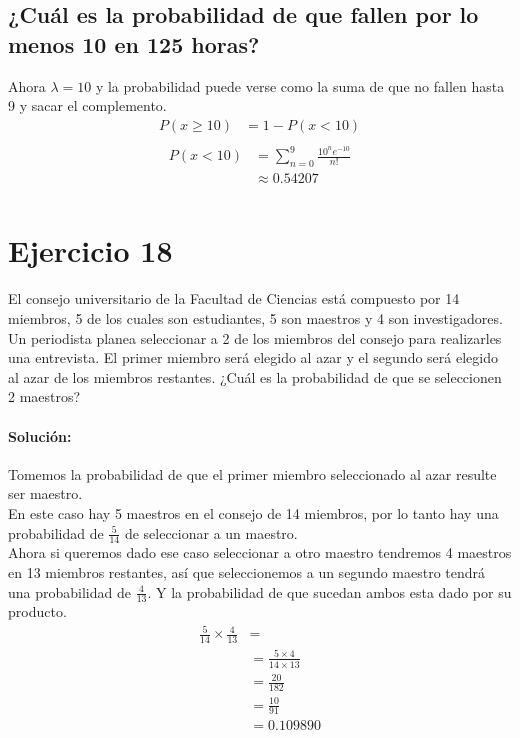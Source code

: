 \documentclass[12pt]{article}
\begin{document}
\subsection{¿Cuál es la probabilidad de que fallen por lo menos 10 en 125 horas?}
Ahora $\lambda=10$ y la probabilidad puede verse como la suma de que no fallen hasta 9 y sacar el complemento.\\
\begin{equation}
\begin{split}
P(x\geq10)&= 1 - P(x<10)\\
\end{split}
\end{equation}
\begin{equation}
\begin{split}
P(x<10)&= \sum_{n=0}^{9} \frac{10^ne^{-10}}{n!}\\
&\approx 0.54207\\
\end{split}
\end{equation}
\section{Ejercicio 18}
 El consejo universitario de la Facultad de Ciencias está compuesto por 14 miembros, 5 de los
cuales son estudiantes, 5 son maestros y 4 son investigadores. Un periodista planea seleccionar
a 2 de los miembros del consejo para realizarles una entrevista. El primer miembro será elegido
al azar y el segundo será elegido al azar de los miembros restantes. ¿Cuál es la probabilidad
de que se seleccionen 2 maestros?
\paragraph{Solución: } Tomemos la probabilidad de que el primer miembro seleccionado al azar resulte ser maestro.\\
En este caso hay 5 maestros en el consejo de 14 miembros, por lo tanto hay una probabilidad de $\frac{5}{14}$ de seleccionar a un maestro.\\
Ahora si queremos dado ese caso seleccionar a otro maestro tendremos 4 maestros en 13 miembros restantes, así que seleccionemos a un segundo maestro tendrá una probabilidad de $\frac{4}{13}$.
Y la probabilidad de que sucedan ambos esta dado por su producto.\\
\begin{equation}
	\begin{split}
	\frac{5}{14} \times \frac{4}{13}&=\\
	&=\frac{5\times 4}{14 \times 13} \\
	&=\frac{20}{182} \\
	&=\frac{10}{91}\\
	&= 0.109890
	\end{split}
\end{equation}
\end{document}
